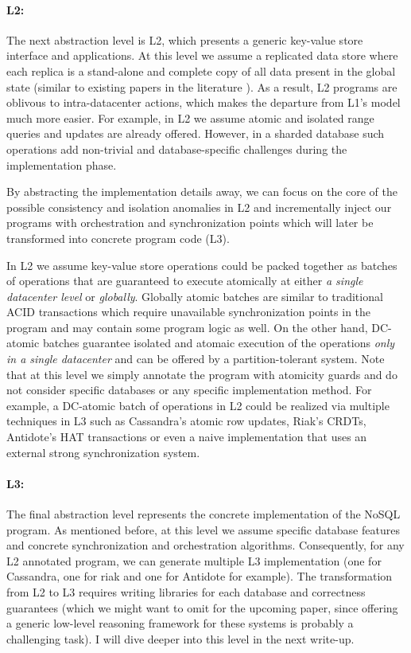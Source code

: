 \documentclass[12pt,letter]{article}
\begin{document}
\paragraph{L2:}
The next abstraction level is L2, which presents a generic key-value store interface and applications.
At this level we assume a replicated data store where each replica is a
stand-alone and complete copy of all data present in the global state (similar
to existing papers in the literature \cite{quelea,bolton,rdt}). 
As a result, L2 programs are oblivous to intra-datacenter actions, which
makes the departure from L1's model much more easier. 
For example, in L2 we assume atomic and isolated 
range queries and updates are already offered. However, in a
sharded database such operations add non-trivial and
database-specific challenges during the implementation phase. 

By abstracting the implementation details away, we can focus on the core of the
possible 
consistency and isolation anomalies in L2 and incrementally inject our programs with 
orchestration and synchronization points which will later be transformed into
concrete program code (L3). 

In L2 we assume key-value store operations could be packed together as batches
of operations that are guaranteed to execute atomically at either \emph{a single
datacenter level} or  \emph{globally}. Globally atomic batches are similar to
traditional ACID transactions which require unavailable synchronization points
in the program and may contain some program logic as well. On the other hand, DC-atomic batches guarantee isolated and
atomaic execution of the operations \emph{only in a single datacenter} and can be
offered by a partition-tolerant system. Note that at this level we simply
annotate the program with atomicity guards and do not consider specific 
databases or any specific implementation method. 
For example, a DC-atomic batch of operations in L2 could
be realized via multiple techniques in L3 such as Cassandra's atomic row updates,
Riak's CRDTs, Antidote's HAT transactions or even a naive implementation that
uses an external strong synchronization system.
\paragraph{L3:} The final abstraction level represents the concrete implementation
of the NoSQL program. As mentioned before, at this level we assume specific
database features and concrete synchronization and orchestration algorithms.
Consequently, for any L2 annotated program, we can generate multiple L3 implementation (one
for Cassandra, one for riak and one for Antidote for example). The transformation from
L2 to L3 requires writing libraries for each database and correctness
guarantees (which we might want to omit for the upcoming paper, since offering a
generic low-level reasoning framework for these systems is probably a
challenging task).
I will dive deeper into this level in the next write-up.
\end{document}
